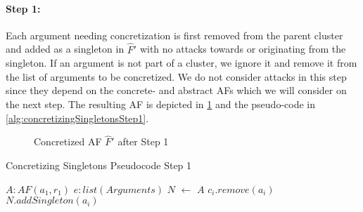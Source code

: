 \paragraph{Step 1:} Each argument needing concretization is first removed from the parent cluster and added as a singleton in $\hat{F}'$ with no attacks towards or originating from the singleton. If an argument is not part of a cluster, we ignore it and remove it from the list of arguments to be concretized.
We do not consider attacks in this step since they depend on the concrete- and abstract AFs which we will consider on the next step. The resulting AF is depicted in \cref{example:algorithmConcretizeSingletonsStep1} and the pseudo-code in \cref{alg:concretizingSingletonsStep1}.


\vspace{0.3cm}
\begin{figure}[h]
    \centering
    \caption{Concretized AF $\hat{F}'$ after Step 1}
    \label{example:algorithmConcretizeSingletonsStep1}
\end{figure}
\vspace{-0.2cm}


\begin{algorithm}[H]
    \caption{Concretizing Singletons Pseudocode Step 1}\label{alg:concretizingSingletonsStep1}
    \begin{algorithmic}[1]
        \Require $A: AF(a_1, r_1)$ 
        \Require $e: list(Arguments)$ 
        \State $N$ $\gets$ $A$ 
                    \State $c_i.remove(a_i)$
                \EndIf
                \EndFor
            \State $N.addSingleton(a_i)$
        \EndFor
    \end{algorithmic}
\end{algorithm}




